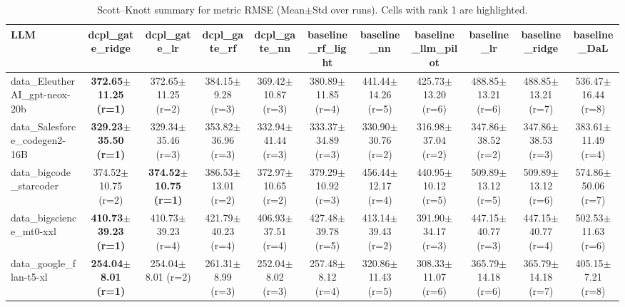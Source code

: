 \begin{table}[t]
\centering
\small
\caption{Scott--Knott summary for metric RMSE (Mean$\pm$Std over runs). Cells with rank 1 are highlighted.}
\label{tab:sk_rmse}
\setlength{\tabcolsep}{4pt}
\renewcommand{\arraystretch}{1.15}
\begin{tabular}{lcccccccccc}
\toprule
LLM & dcpl\_gate\_ridge & dcpl\_gate\_lr & dcpl\_gate\_rf & dcpl\_gate\_nn & baseline\_rf\_light & baseline\_nn & baseline\_llm\_pilot & baseline\_lr & baseline\_ridge & baseline\_DaL \\
\midrule
data\_EleutherAI\_gpt-neox-20b & \cellcolor{red!15}\textbf{372.65$\pm$11.25 {\scriptsize (r=1)}} & 372.65$\pm$11.25 {\scriptsize (r=2)} & 384.15$\pm$9.28 {\scriptsize (r=3)} & 369.42$\pm$10.87 {\scriptsize (r=3)} & 380.89$\pm$11.85 {\scriptsize (r=4)} & 441.44$\pm$14.26 {\scriptsize (r=5)} & 425.73$\pm$13.20 {\scriptsize (r=6)} & 488.85$\pm$13.21 {\scriptsize (r=6)} & 488.85$\pm$13.21 {\scriptsize (r=7)} & 536.47$\pm$16.44 {\scriptsize (r=8)} \\
data\_Salesforce\_codegen2-16B & \cellcolor{red!15}\textbf{329.23$\pm$35.50 {\scriptsize (r=1)}} & 329.34$\pm$35.46 {\scriptsize (r=3)} & 353.82$\pm$36.96 {\scriptsize (r=3)} & 332.94$\pm$41.44 {\scriptsize (r=3)} & 333.37$\pm$34.89 {\scriptsize (r=3)} & 330.90$\pm$30.76 {\scriptsize (r=2)} & 316.98$\pm$37.04 {\scriptsize (r=2)} & 347.86$\pm$38.52 {\scriptsize (r=2)} & 347.86$\pm$38.53 {\scriptsize (r=3)} & 383.61$\pm$11.49 {\scriptsize (r=4)} \\
data\_bigcode\_starcoder & 374.52$\pm$10.75 {\scriptsize (r=2)} & \cellcolor{red!15}\textbf{374.52$\pm$10.75 {\scriptsize (r=1)}} & 386.53$\pm$13.01 {\scriptsize (r=2)} & 372.97$\pm$10.65 {\scriptsize (r=2)} & 379.29$\pm$10.92 {\scriptsize (r=3)} & 456.44$\pm$12.17 {\scriptsize (r=4)} & 440.95$\pm$10.12 {\scriptsize (r=5)} & 509.89$\pm$13.12 {\scriptsize (r=5)} & 509.89$\pm$13.12 {\scriptsize (r=6)} & 574.86$\pm$50.06 {\scriptsize (r=7)} \\
data\_bigscience\_mt0-xxl & \cellcolor{red!15}\textbf{410.73$\pm$39.23 {\scriptsize (r=1)}} & 410.73$\pm$39.23 {\scriptsize (r=4)} & 421.79$\pm$40.23 {\scriptsize (r=4)} & 406.93$\pm$37.51 {\scriptsize (r=4)} & 427.48$\pm$39.78 {\scriptsize (r=5)} & 413.14$\pm$39.43 {\scriptsize (r=2)} & 391.90$\pm$34.17 {\scriptsize (r=3)} & 447.15$\pm$40.77 {\scriptsize (r=3)} & 447.15$\pm$40.77 {\scriptsize (r=4)} & 502.53$\pm$11.63 {\scriptsize (r=6)} \\
data\_google\_flan-t5-xl & \cellcolor{red!15}\textbf{254.04$\pm$8.01 {\scriptsize (r=1)}} & 254.04$\pm$8.01 {\scriptsize (r=2)} & 261.31$\pm$8.99 {\scriptsize (r=3)} & 252.04$\pm$8.02 {\scriptsize (r=3)} & 257.48$\pm$8.12 {\scriptsize (r=4)} & 320.86$\pm$11.43 {\scriptsize (r=5)} & 308.33$\pm$11.07 {\scriptsize (r=6)} & 365.79$\pm$14.18 {\scriptsize (r=6)} & 365.79$\pm$14.18 {\scriptsize (r=7)} & 405.15$\pm$7.21 {\scriptsize (r=8)} \\

\end{tabular}
\end{table}
